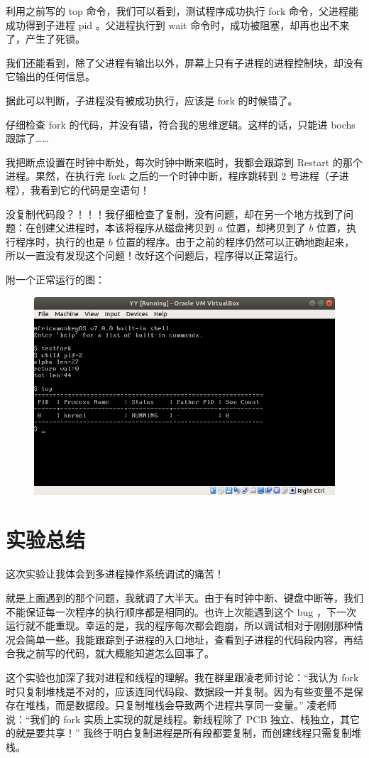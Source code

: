 \documentclass{article}
\begin{document}
利用之前写的 top 命令，我们可以看到，测试程序成功执行 fork 命令，父进程能成功得到子进程 pid 。父进程执行到 wait 命令时，成功被阻塞，却再也出不来了，产生了死锁。

我们还能看到，除了父进程有输出以外，屏幕上只有子进程的进程控制块，却没有它输出的任何信息。

据此可以判断，子进程没有被成功执行，应该是 fork 的时候错了。

仔细检查 fork 的代码，并没有错，符合我的思维逻辑。这样的话，只能进 bochs 跟踪了……

我把断点设置在时钟中断处，每次时钟中断来临时，我都会跟踪到 Restart 的那个进程。果然，在执行完 fork 之后的一个时钟中断，程序跳转到 2 号进程（子进程），我看到它的代码是空语句！

没复制代码段？！！！我仔细检查了复制，没有问题，却在另一个地方找到了问题：在创建父进程时，本该将程序从磁盘拷贝到 $a$ 位置，却拷贝到了 $b$ 位置，执行程序时，执行的也是 $b$ 位置的程序。由于之前的程序仍然可以正确地跑起来，所以一直没有发现这个问题！改好这个问题后，程序得以正常运行。

附一个正常运行的图：

\begin{figure}[!hbp]
	\centering
	\includegraphics[scale=0.55]{pics/2.png}
\end{figure}

\section{实验总结}

这次实验让我体会到多进程操作系统调试的痛苦！

就是上面遇到的那个问题，我就调了大半天。由于有时钟中断、键盘中断等，我们不能保证每一次程序的执行顺序都是相同的。也许上次能遇到这个 bug ，下一次运行就不能重现。幸运的是，我的程序每次都会跑崩，所以调试相对于刚刚那种情况会简单一些。我能跟踪到子进程的入口地址，查看到子进程的代码段内容，再结合我之前写的代码，就大概能知道怎么回事了。

这个实验也加深了我对进程和线程的理解。我在群里跟凌老师讨论：“我认为 fork 时只复制堆栈是不对的，应该连同代码段、数据段一并复制。因为有些变量不是保存在堆栈，而是数据段。只复制堆栈会导致两个进程共享同一变量。” 凌老师说：“我们的 fork 实质上实现的就是线程。新线程除了 PCB 独立、栈独立，其它的就是要共享！” 我终于明白复制进程是所有段都要复制，而创建线程只需复制堆栈。
\end{document}
